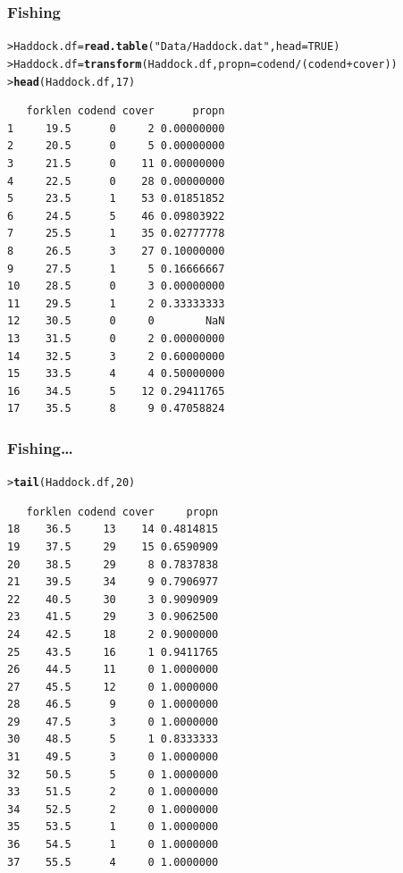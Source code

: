 \documentclass{beamer}\usepackage[]{graphicx}\usepackage[]{xcolor}
\makeatletter
\newcommand{\hlnum}[1]{\textcolor[rgb]{0.686,0.059,0.569}{#1}}%
\newcommand{\hlstr}[1]{\textcolor[rgb]{0.192,0.494,0.8}{#1}}%
\newcommand{\hlopt}[1]{\textcolor[rgb]{0,0,0}{#1}}%
\newcommand{\hlstd}[1]{\textcolor[rgb]{0.345,0.345,0.345}{#1}}%
\newcommand{\hlkwb}[1]{\textcolor[rgb]{0.69,0.353,0.396}{#1}}%
\newcommand{\hlkwc}[1]{\textcolor[rgb]{0.333,0.667,0.333}{#1}}%
\newcommand{\hlkwd}[1]{\textcolor[rgb]{0.737,0.353,0.396}{\textbf{#1}}}%
\newenvironment{kframe}{%
 \def\at@end@of@kframe{}%
 \ifinner\ifhmode%
  \def\at@end@of@kframe{\end{minipage}}%
  \begin{minipage}{\columnwidth}%
 \fi\fi%
 \def\FrameCommand##1{\hskip\@totalleftmargin \hskip-\fboxsep
 \colorbox{shadecolor}{##1}\hskip-\fboxsep
     \hskip-\linewidth \hskip-\@totalleftmargin \hskip\columnwidth}%
 \MakeFramed {\advance\hsize-\width
   \@totalleftmargin\z@ \linewidth\hsize
   \@setminipage}}%
 {\par\unskip\endMakeFramed%
 \at@end@of@kframe}
\newenvironment{knitrout}{}{} %
\makeatother
\begin{document}
\begin{frame}[fragile]
\frametitle{Fishing}
\begin{knitrout}\scriptsize
{}\color{fgcolor}\begin{kframe}
\begin{alltt}
\hlstd{> }\hlstd{Haddock.df} \hlkwb{=} \hlkwd{read.table}\hlstd{(}\hlstr{"Data/Haddock.dat"}\hlstd{,} \hlkwc{head} \hlstd{=} \hlnum{TRUE}\hlstd{)}
\hlstd{> }\hlstd{Haddock.df} \hlkwb{=} \hlkwd{transform}\hlstd{(Haddock.df,}\hlkwc{propn}\hlstd{=codend}\hlopt{/}\hlstd{(codend}\hlopt{+}\hlstd{cover))}
\hlstd{> }\hlkwd{head}\hlstd{(Haddock.df,} \hlnum{17}\hlstd{)}
\end{alltt}
\begin{verbatim}
   forklen codend cover      propn
1     19.5      0     2 0.00000000
2     20.5      0     5 0.00000000
3     21.5      0    11 0.00000000
4     22.5      0    28 0.00000000
5     23.5      1    53 0.01851852
6     24.5      5    46 0.09803922
7     25.5      1    35 0.02777778
8     26.5      3    27 0.10000000
9     27.5      1     5 0.16666667
10    28.5      0     3 0.00000000
11    29.5      1     2 0.33333333
12    30.5      0     0        NaN
13    31.5      0     2 0.00000000
14    32.5      3     2 0.60000000
15    33.5      4     4 0.50000000
16    34.5      5    12 0.29411765
17    35.5      8     9 0.47058824
\end{verbatim}
\end{kframe}
\end{knitrout}
\end{frame}


\begin{frame}[fragile]
\frametitle{Fishing\ldots}
\begin{knitrout}\scriptsize
{}\color{fgcolor}\begin{kframe}
\begin{alltt}
\hlstd{> }\hlkwd{tail}\hlstd{(Haddock.df,} \hlnum{20}\hlstd{)}
\end{alltt}
\begin{verbatim}
   forklen codend cover     propn
18    36.5     13    14 0.4814815
19    37.5     29    15 0.6590909
20    38.5     29     8 0.7837838
21    39.5     34     9 0.7906977
22    40.5     30     3 0.9090909
23    41.5     29     3 0.9062500
24    42.5     18     2 0.9000000
25    43.5     16     1 0.9411765
26    44.5     11     0 1.0000000
27    45.5     12     0 1.0000000
28    46.5      9     0 1.0000000
29    47.5      3     0 1.0000000
30    48.5      5     1 0.8333333
31    49.5      3     0 1.0000000
32    50.5      5     0 1.0000000
33    51.5      2     0 1.0000000
34    52.5      2     0 1.0000000
35    53.5      1     0 1.0000000
36    54.5      1     0 1.0000000
37    55.5      4     0 1.0000000
\end{verbatim}
\end{kframe}
\end{knitrout}
\end{frame}
\end{document}
